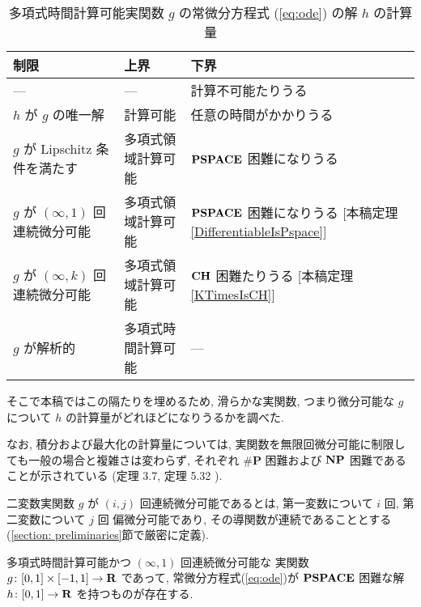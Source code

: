 \begin{table}
\renewcommand\arraystretch{1.3}
\begin{center}
 \caption{多項式時間計算可能実関数 $g$ の常微分方程式 (\ref{eq:ode}) の解 $h$ の計算量}
 \label{table:related}
 \begin{tabular}{lll}
  制限 & 上界 & 下界 \\
  \hline
   --- & --- & 計算不可能たりうる \cite{pour1979computable} \\
  $h$ が $g$ の唯一解 & 計算可能 \cite{coddington1955theory}
  & 任意の時間がかかりうる \cite{ko1983computational, miller1970recursive} \\
  $g$ が Lipschitz 条件を満たす & 多項式領域計算可能
      &	$\mathbf{PSPACE}$ 困難になりうる \cite{kawamura2010lipschitz}\\
  $g$ が $(\infty, 1)$ 回連続微分可能 & 多項式領域計算可能 & \parbox[t]{14zw}{$\mathbf{PSPACE}$ 困難になりうる\\{}[本稿定理\ref{DifferentiableIsPspace}]} \\
  $g$ が $(\infty, k)$ 回連続微分可能 & 多項式領域計算可能 & \parbox[t]{14zw}{$\mathbf{CH}$ 困難たりうる\\{}[本稿定理\ref{KTimesIsCH}]} \\
  $g$ が解析的 
  & 多項式時間計算可能 \cite{ko1988computing, kawamura2010complexity} 
  & ---
 \end{tabular}
\end{center}
\end{table}

そこで本稿ではこの隔たりを埋めるため, 滑らかな実関数, 
つまり微分可能な $g$ について $h$ の計算量がどれほどになりうるかを調べた.

なお, 積分および最大化の計算量については,
実関数を無限回微分可能に制限しても一般の場合と複雑さは変わらず,
それぞれ $\mathbf{\#P}$ 困難および $\mathbf{NP}$ 困難であることが示されている
(定理 3.7, 定理 5.32 \cite{ko1991complexity}).


二変数実関数 $g$ が $(i, j)$ 回連続微分可能であるとは,
第一変数について $i$ 回, 第二変数について $j$ 回
偏微分可能であり, その導関数が連続であることとする
(\ref{section: preliminaries}節で厳密に定義).

 \begin{theorem}
  \label{DifferentiableIsPspace}
  多項式時間計算可能かつ $(\infty, 1)$ 回連続微分可能な
  実関数 $g \colon [0,1] \times [-1,1] \to \mathbf R$ であって, 
  常微分方程式(\ref{eq:ode})が
  $\mathbf{PSPACE}$ 困難な解 $h \colon [0, 1] \to \mathbf R$ を持つものが存在する.
 \end{theorem}

